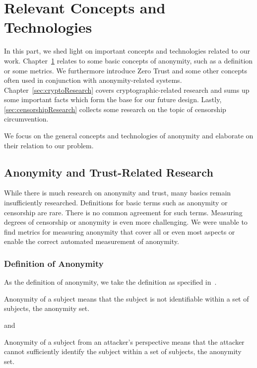 
\part{Relevant Concepts and Technologies}\label{sec:concepts}
In this part, we shed light on important concepts and technologies related to our work. Chapter~\ref{sec:anontrustResearch} relates to some basic concepts of anonymity, such as a definition or some metrics. We furthermore introduce Zero Trust and some other concepts often used in conjunction with anonymity-related systems. Chapter~\ref{sec:cryptoResearch} covers cryptographic-related research and sums up some important facts which form the base for our future design. Lastly, \cref{sec:censorshipResearch} collects some research on the topic of censorship circumvention.

We focus on the general concepts and technologies of anonymity and elaborate on their relation to our problem.

\chapter{Anonymity and Trust-Related Research}\label{sec:anontrustResearch}
While there is much research on anonymity and trust, many basics remain insufficiently researched. Definitions for basic terms such as anonymity or censorship are rare. There is no common agreement for such terms. Measuring degrees of censorship or anonymity is even more challenging. We were unable to find metrics for measuring anonymity that cover all or even most aspects or enable the correct automated measurement of anonymity.

\section{Definition of Anonymity}
As the definition of anonymity, we take the definition as specified in~\cite{anonTerminology}.
\begin{shadequote}{}
	Anonymity of a subject means that the subject is not identifiable within a set of subjects, the anonymity set.\omitted
\end{shadequote}
and
\begin{shadequote}{}
	Anonymity of a subject from an attacker's perspective means that the attacker cannot sufficiently identify the subject within a set of subjects, the anonymity set.\omitted
\end{shadequote}

